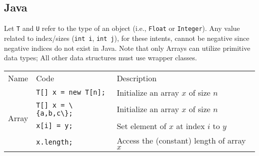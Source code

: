 \documentclass{article}
\begin{document}
\subsection{Java}
Let \lstinline|T| and \lstinline|U| refer to the type of an object (i.e., \lstinline|Float| or \lstinline|Integer|). Any value related to index/sizes (\lstinline|int i|, \lstinline|int j|), for these intents, cannot be negative since negative indices do not exist in Java. Note that only Arrays can utilize primitive data types; All other data structures must use wrapper classes.
\setlength{\tabcolsep}{3pt}
\begin{center}\begin{tabularx}{\textwidth}{llX}\toprule
  Name & Code & Description\\
\multirow{4}{*}{Array} & \lstinline|T[] x = new T[n];| & Initialize an array \(x\) of size \(n\)\\
& \lstinline|T[] x = \{a,b,c\};| & Initialize an array \(x\) of size \(n\)\\
& \lstinline|x[i] = y;| & Set element of \(x\) at index \(i\) to \(y\)\\
& \lstinline|x.length;| & Access the (constant) length of array \(x\) \\\midrule


\end{tabularx}
\end{center}
\end{document}
